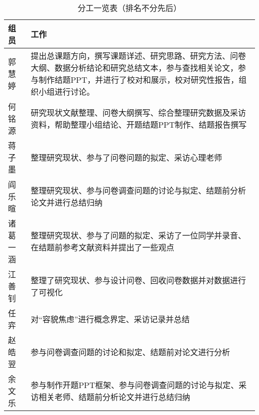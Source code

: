 \begin{table}[H]
    \centering
    \caption{分工一览表（排名不分先后）}
    \begin{tabularx}{0.8\textwidth}{>{\raggedright\arraybackslash}X
        | >{\raggedright\arraybackslash}X}
        \hline
        \textbf{组员} & \textbf{工作}                                             \\ \hline
        郭慧婷         & 提出总课题方向，撰写课题详述、研究思路、研究方法、问卷大纲、数据分析结论和研究总结文本，参与查找相关论文，参与制作结题PPT，并进行了校对和展示，校对研究性报告，组织小组进行讨论。           \\ \hline
        何铭源         & 研究现状文献整理、问卷大纲撰写、综合整理研究数据及采访资料，帮助整理小组结论、开题结题PPT制作、结题报告撰写 \\ \hline
        蒋子墨         & 整理研究现状、参与了问卷问题的拟定、采访心理老师                                \\ \hline
        阎乐暄         & 整理研究现状、参与问卷调查问题的讨论与拟定、结题前分析论文并进行总结归纳                    \\ \hline
        诸葛一涵        & 整理研究现状、参与了问题的拟定、采访了一位同学并录音、在结题前参考文献资料并提出了一些观点           \\ \hline
        江善钊         & 整理了研究现状、参与设计问卷、回收问卷数据并对数据进行了可视化                         \\ \hline
        任弈          & 对``容貌焦虑''进行概念界定、采访记录并总结                                   \\ \hline
        赵皓翌         & 参与问卷调查问题的讨论和拟定、结题前对论文进行分析                               \\ \hline
        余文乐         & 参与制作开题PPT框架、参与问卷调查问题的讨论与拟定、采访相关老师、结题前分析论文并进行总结归纳       \\ \hline
    \end{tabularx}
\end{table}